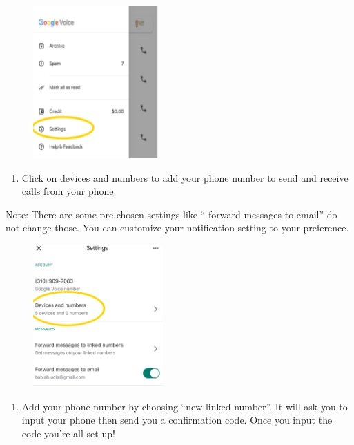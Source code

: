 \documentclass[]{book}
\providecommand{\tightlist}{%
  \setlength{\itemsep}{0pt}\setlength{\parskip}{0pt}}
\begin{document}
\begin{figure}
\centering
\includegraphics{images/research_protocols/google_voice/pic5.png}
\caption{}
\end{figure}

\begin{enumerate}
\def\labelenumi{\arabic{enumi})}
\setcounter{enumi}{5}
\tightlist
\item
  Click on devices and numbers to add your phone number to send and
  receive calls from your phone.
\end{enumerate}

Note: There are some pre-chosen settings like `` forward messages to
email'' do not change those. You can customize your notification setting
to your preference.

\begin{figure}
\centering
\includegraphics{images/research_protocols/google_voice/pic6.png}
\caption{}
\end{figure}

\begin{enumerate}
\def\labelenumi{\arabic{enumi})}
\setcounter{enumi}{6}
\tightlist
\item
  Add your phone number by choosing ``new linked number''. It will ask
  you to input your phone then send you a confirmation code. Once you
  input the code you're all set up!
\end{enumerate}
\end{document}
